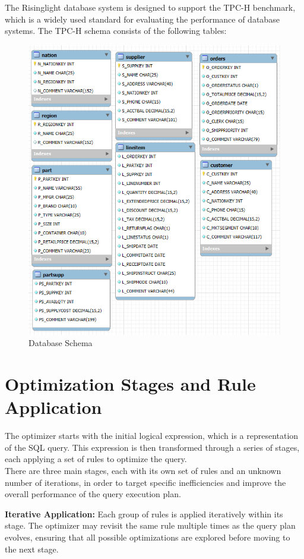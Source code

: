 \documentclass[a4paper,12pt]{scrreprt}
\begin{document}
The Risinglight database system is designed to support the TPC-H benchmark, which is a widely used standard for evaluating the performance of database systems. The TPC-H schema consists of the following tables:
\begin{figure}[H]
    \centering
    \includegraphics[width=0.75\linewidth]{img/image.png}
    \caption{Database Schema}
    \label{fig:database_schema}
\end{figure}


\chapter{Optimization Stages and Rule Application}
\thispagestyle{fancy}
The optimizer starts with the initial logical expression, which is a representation of the SQL query. This expression is then transformed through a series of stages, each applying a set of rules to optimize the query. \\
There are three main stages, each with its own set of rules and an unknown number of iterations, in order to target specific inefficiencies and improve the overall performance of the query execution plan. 


\textbf{Iterative Application:} Each group of rules is applied iteratively within its stage. The optimizer may revisit the same rule multiple times as the query plan evolves, ensuring that all possible optimizations are explored before moving to the next stage.
\end{document}
